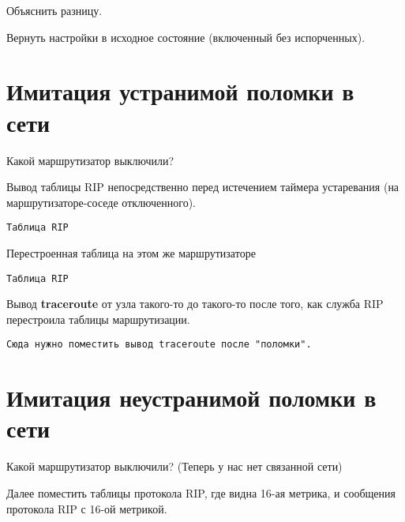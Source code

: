 \documentclass[a4paper,12pt]{article}
\begin{document}
Объяснить разницу.

Вернуть настройки в исходное состояние (включенный без испорченных).

\section{Имитация устранимой поломки в сети}

Какой маршрутизатор выключили?

Вывод таблицы RIP непосредственно перед истечением таймера устаревания (на маршрутизаторе-соседе отключенного).

\begin{Verbatim}
Таблица RIP
\end{Verbatim}

Перестроенная таблица на этом же маршрутизаторе

\begin{Verbatim}
Таблица RIP
\end{Verbatim}


Вывод \textbf{traceroute} от узла такого-то до такого-то после того, как служба RIP перестроила таблицы маршрутизации.

\begin{Verbatim}
Сюда нужно поместить вывод traceroute после "поломки".
\end{Verbatim}

\section{Имитация неустранимой поломки в сети}

Какой маршрутизатор выключили? (Теперь у нас нет связанной сети)

Далее поместить таблицы протокола RIP, где видна 16-ая метрика, и сообщения протокола RIP с 16-ой метрикой.
\end{document}
